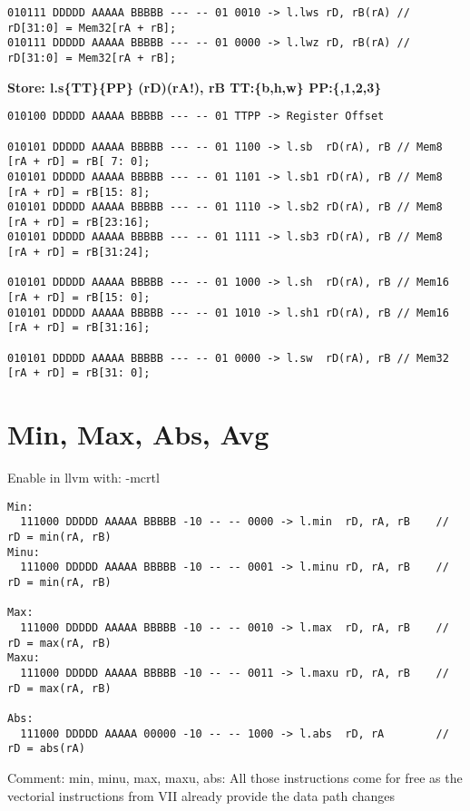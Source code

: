 \begin{landscape}
\begin{verbatim}
010111 DDDDD AAAAA BBBBB --- -- 01 0010 -> l.lws rD, rB(rA) // rD[31:0] = Mem32[rA + rB];
010111 DDDDD AAAAA BBBBB --- -- 01 0000 -> l.lwz rD, rB(rA) // rD[31:0] = Mem32[rA + rB];
\end{verbatim}


\textbf{Store: l.s\{TT\}\{PP\} (rD)(rA!), rB TT:\{b,h,w\} PP:\{,1,2,3\}}

\begin{verbatim}
010100 DDDDD AAAAA BBBBB --- -- 01 TTPP -> Register Offset

010101 DDDDD AAAAA BBBBB --- -- 01 1100 -> l.sb  rD(rA), rB // Mem8 [rA + rD] = rB[ 7: 0];
010101 DDDDD AAAAA BBBBB --- -- 01 1101 -> l.sb1 rD(rA), rB // Mem8 [rA + rD] = rB[15: 8];
010101 DDDDD AAAAA BBBBB --- -- 01 1110 -> l.sb2 rD(rA), rB // Mem8 [rA + rD] = rB[23:16];
010101 DDDDD AAAAA BBBBB --- -- 01 1111 -> l.sb3 rD(rA), rB // Mem8 [rA + rD] = rB[31:24];

010101 DDDDD AAAAA BBBBB --- -- 01 1000 -> l.sh  rD(rA), rB // Mem16 [rA + rD] = rB[15: 0];
010101 DDDDD AAAAA BBBBB --- -- 01 1010 -> l.sh1 rD(rA), rB // Mem16 [rA + rD] = rB[31:16];

010101 DDDDD AAAAA BBBBB --- -- 01 0000 -> l.sw  rD(rA), rB // Mem32 [rA + rD] = rB[31: 0];
\end{verbatim}







\newpage
\section{Min, Max, Abs, Avg}
Enable in llvm with: -mcrtl

\begin{verbatim}
Min:
  111000 DDDDD AAAAA BBBBB -10 -- -- 0000 -> l.min  rD, rA, rB    // rD = min(rA, rB)
Minu:
  111000 DDDDD AAAAA BBBBB -10 -- -- 0001 -> l.minu rD, rA, rB    // rD = min(rA, rB)

Max:
  111000 DDDDD AAAAA BBBBB -10 -- -- 0010 -> l.max  rD, rA, rB    // rD = max(rA, rB)
Maxu:
  111000 DDDDD AAAAA BBBBB -10 -- -- 0011 -> l.maxu rD, rA, rB    // rD = max(rA, rB)

Abs:
  111000 DDDDD AAAAA 00000 -10 -- -- 1000 -> l.abs  rD, rA        // rD = abs(rA)
\end{verbatim}

Comment: min, minu, max, maxu, abs: All those instructions come for free as the vectorial instructions from VII already provide the data path changes


\end{landscape}
